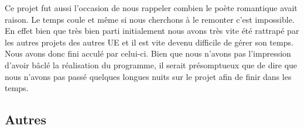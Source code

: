 \documentclass{article}
\begin{document}
        Ce projet fut aussi l'occasion de nous rappeler combien le poète romantique avait raison. Le temps coule et même si nous cherchons à le remonter c'est impossible. En effet bien que très bien parti initialement nous avons très vite été rattrapé par les autres projets des autres UE et il est vite devenu difficile de gérer son temps. Nous avons donc fini acculé par celui-ci. Bien que nous n'avons pas l'impression d'avoir bâclé la réalisation du programme, il serait présomptueux que de dire que nous n'avons pas passé quelques longues nuits sur le projet afin de finir dans les temps. 
    
    \subsection{Autres}
\end{document}
